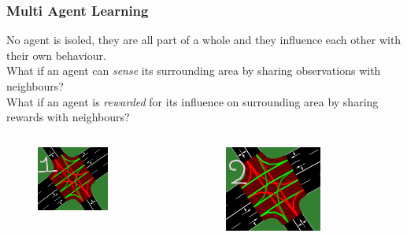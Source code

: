 \documentclass[dvipsnames]{beamer}
\begin{document}
\begin{frame}
\frametitle{Multi Agent Learning}

  {\small
  No agent is isoled, they are all part of a whole and they influence each other with their own behaviour. \\
  What if an agent can \textit{sense} its surrounding area by sharing observations with neighbours? \\
  What if an agent is \textit{rewarded} for its influence on surrounding area by sharing rewards with neighbours?}

  \begin{columns}
    \begin{column}{0.3\textwidth}
      \begin{figure}
        \centering
        \includegraphics[width=0.65\textwidth]{figures/sumo-rf-tls-1.png}
      \end{figure}
    \end{column}
    \begin{column}{0.3\textwidth}
      \begin{figure}
        \centering
        \includegraphics[width=0.65\textwidth]{figures/sumo-rf-tls-2.png}

\end{figure}
\end{column}
\end{columns}
\end{frame}
\end{document}

